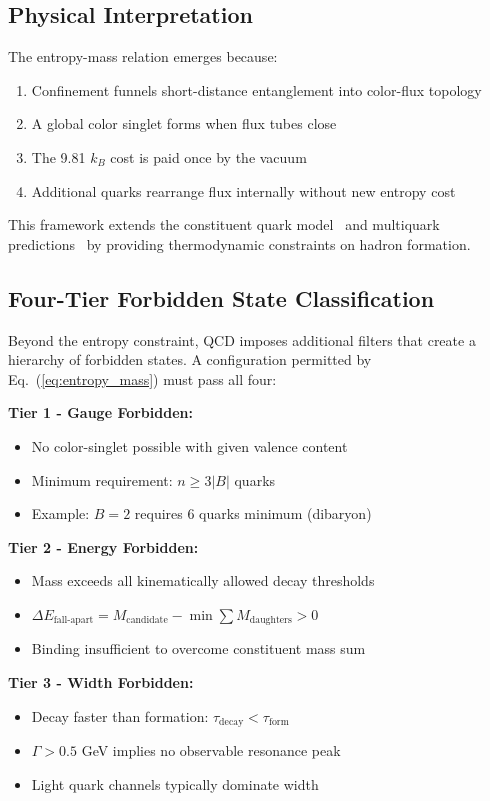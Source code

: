 \documentclass[12pt,a4paper]{article}
\begin{document}
\subsection{Physical Interpretation}

The entropy-mass relation emerges because:

\begin{enumerate}
\item Confinement funnels short-distance entanglement into color-flux topology
\item A global color singlet forms when flux tubes close
\item The 9.81 $k_B$ cost is paid once by the vacuum
\item Additional quarks rearrange flux internally without new entropy cost
\end{enumerate}

This framework extends the constituent quark model~\cite{Gell-Mann1964} and multiquark predictions~\cite{Jaffe1977} by providing thermodynamic constraints on hadron formation.

\subsection{Four-Tier Forbidden State Classification}

Beyond the entropy constraint, QCD imposes additional filters that create a hierarchy of forbidden states. A configuration permitted by Eq.~(\ref{eq:entropy_mass}) must pass all four:

\textbf{Tier 1 - Gauge Forbidden:} 
\begin{itemize}
\item No color-singlet possible with given valence content
\item Minimum requirement: $n \geq 3|B|$ quarks
\item Example: $B=2$ requires 6 quarks minimum (dibaryon)
\end{itemize}

\textbf{Tier 2 - Energy Forbidden:} 
\begin{itemize}
\item Mass exceeds all kinematically allowed decay thresholds
\item $\Delta E_{\text{fall-apart}} = M_{\text{candidate}} - \min\sum M_{\text{daughters}} > 0$
\item Binding insufficient to overcome constituent mass sum
\end{itemize}

\textbf{Tier 3 - Width Forbidden:} 
\begin{itemize}
\item Decay faster than formation: $\tau_{\text{decay}} < \tau_{\text{form}}$
\item $\Gamma > 0.5$ GeV implies no observable resonance peak
\item Light quark channels typically dominate width
\end{itemize}
\end{document}
